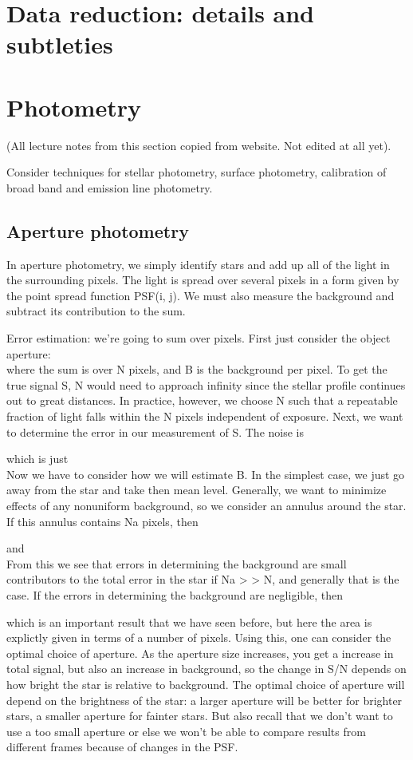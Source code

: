 \documentclass[12pt]{article}
\begin{document}
\section{Data reduction: details and subtleties}

\section{Photometry}

(All lecture notes from this section copied from website. Not edited
at all yet).

Consider techniques for stellar photometry, surface photometry,
calibration of broad band and emission line photometry.


\subsection{Aperture photometry}
In aperture photometry, we simply identify stars and add up all of the
light in the surrounding pixels. The light is spread over several
pixels in a form given by the point spread function PSF(i, j). We must
also measure the background and subtract its contribution to the sum.

Error estimation: we're going to sum over pixels. First just consider
the object aperture:
\[
    \]
where the sum is over N pixels, and B is the background per pixel. To
get the true signal S, N would need to approach infinity since the
stellar profile continues out to great distances. In practice,
however, we choose N such that a repeatable fraction of light falls
within the N pixels independent of exposure. Next, we want to
determine the error in our measurement of S. The noise is

\[
    \]
which is just
\[
    \]
Now we have to consider how we will estimate B. In the simplest case,
we just go away from the star and take then mean level. Generally, we
want to minimize effects of any nonuniform background, so we consider
an annulus around the star. If this annulus contains Na pixels, then


\[
    \]
and
\[
    \]
From this we see that errors in determining the background are small
contributors to the total error in the star if Na > > N, and generally
that is the case. If the errors in determining the background are
negligible, then

\[
    \]
which is an important result that we have seen before, but here the
area is explictly given in terms of a number of pixels.
Using this, one can consider the optimal choice of aperture. As the
aperture size increases, you get a increase in total signal, but also
an increase in background, so the change in S/N depends on how bright
the star is relative to background. The optimal choice of aperture
will depend on the brightness of the star: a larger aperture will be
better for brighter stars, a smaller aperture for fainter stars. But
also recall that we don't want to use a too small aperture or else we
won't be able to compare results from different frames because of
changes in the PSF.
\end{document}
